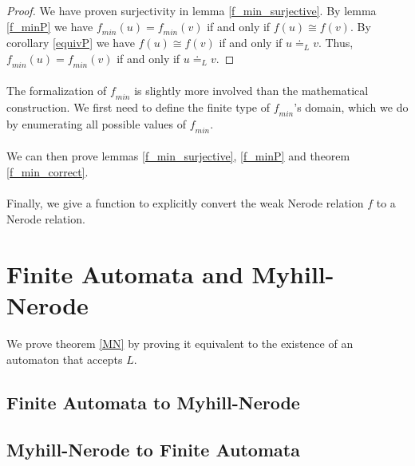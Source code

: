 \begin{proof}
    We have proven surjectivity in lemma \ref{f_min_surjective}. 
    By lemma \ref{f_minP} we have $\mathit{f_{min}}(u) = \mathit{f_{min}}(v)$ if and only if $f(u) \cong f(v)$.
    By corollary \ref{equivP} we have $f(u) \cong f(v)$ if and only if $u \doteq_L v$.
    Thus, $\mathit{f_{min}}(u) = \mathit{f_{min}}(v)$ if and only if $u \doteq_L v$.
\end{proof}

\paragraph{}
The formalization of $\mathit{f_{min}}$ is slightly more involved than the mathematical construction. 
We first need to define the finite type of $\mathit{f_{min}}$'s domain, 
which we do by enumerating all possible values of $\mathit{f_{min}}$.


\paragraph{}
We can then prove lemmas \ref{f_min_surjective}, \ref{f_minP} and theorem \ref{f_min_correct}.


\paragraph{}
Finally, we give a function to explicitly convert the weak Nerode relation $f$ to a Nerode relation.


\section{Finite Automata and Myhill-Nerode}

\paragraph{}
We prove theorem \ref{MN} by proving it equivalent to the existence of an automaton that accepts $L$.



\subsection{Finite Automata to Myhill-Nerode}


\subsection{Myhill-Nerode to Finite Automata}

\paragraph{}


